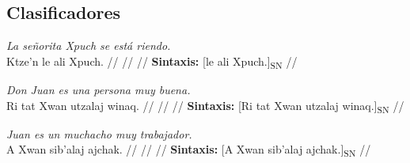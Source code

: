 \documentclass{article}%
\begin{document}
\subsection{Clasificadores}%
\label{subsec:Clasificadores}%

%
\par\medskip%
\ex
\textit{La señorita Xpuch se está riendo.} \\
\begingl
\gla Ktze'n le ali Xpuch. //
\glb  //
\glc  //
\glft \textbf{Sintaxis:} [le ali Xpuch.]\textsubscript{SN} //
\endgl
\xe
%
\medskip%
\par\medskip%
\ex
\textit{Don Juan es una persona muy buena.} \\
\begingl
\gla Ri tat Xwan utzalaj winaq. //
\glb  //
\glc  //
\glft \textbf{Sintaxis:} [Ri tat Xwan utzalaj winaq.]\textsubscript{SN} //
\endgl
\xe
%
\medskip%
\par\medskip%
\ex
\textit{Juan es un muchacho muy trabajador.} \\
\begingl
\gla A Xwan sib'alaj ajchak. //
\glb  //
\glc  //
\glft \textbf{Sintaxis:} [A Xwan sib'alaj ajchak.]\textsubscript{SN} //
\endgl
\xe
%

%
\end{document}
